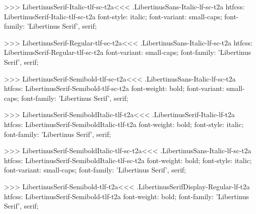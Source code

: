 {{{{{>>>
\<LibertinusSerif-Italic-tlf-sc-t2a\><<<
.LibertinusSans-Italic-lf-sc-t2a
htfcss:  LibertinusSerif-Italic-tlf-sc-t2a  font-style: italic; font-variant: small-caps; font-family: 'Libertinus Serif', serif;

>>>
\<LibertinusSerif-Regular-tlf-sc-t2a\><<<
.LibertinusSans-Italic-lf-sc-t2a
htfcss:  LibertinusSerif-Regular-tlf-sc-t2a  font-variant: small-caps; font-family: 'Libertinus Serif', serif;

>>>
\<LibertinusSerif-Semibold-tlf-sc-t2a\><<<
.LibertinusSans-Italic-lf-sc-t2a
htfcss:  LibertinusSerif-Semibold-tlf-sc-t2a  font-weight: bold; font-variant: small-caps; font-family: 'Libertinus Serif', serif;

>>>
\<LibertinusSerif-SemiboldItalic-tlf-t2a\><<<
.LibertinusSerif-Italic-lf-t2a
htfcss:  LibertinusSerif-SemiboldItalic-tlf-t2a  font-weight: bold; font-style: italic; font-family: 'Libertinus Serif', serif;

>>>
\<LibertinusSerif-SemiboldItalic-tlf-sc-t2a\><<<
.LibertinusSans-Italic-lf-sc-t2a
htfcss:  LibertinusSerif-SemiboldItalic-tlf-sc-t2a  font-weight: bold; font-style: italic; font-variant: small-caps; font-family: 'Libertinus Serif', serif;

>>>
\<LibertinusSerif-Semibold-tlf-t2a\><<<
.LibertinusSerifDisplay-Regular-lf-t2a
htfcss:  LibertinusSerif-Semibold-tlf-t2a  font-weight: bold; font-family: 'Libertinus Serif', serif;

}}}}}
